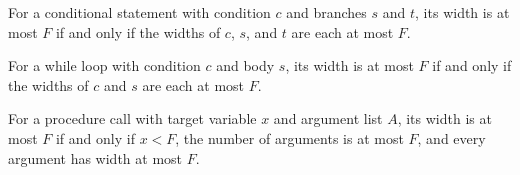 \begin{theorem}
\label{Light.Stmt.width_ite_le_iff}
\leanok
{}
For a conditional statement with condition $c$ and branches $s$ and $t$, its width is at
most $F$ if and only if the widths of $c$, $s$, and $t$ are each at most $F$.
\end{theorem}

\begin{theorem}
\label{Light.Stmt.width_while_le_iff}
\leanok
{}
For a while loop with condition $c$ and body $s$, its width is at most $F$ if and only
if the widths of $c$ and $s$ are each at most $F$.
\end{theorem}

\begin{theorem}
\label{Light.Stmt.width_call_le_iff}
\leanok
{}
For a procedure call with target variable $x$ and argument list $A$, its width is at
most $F$ if and only if $x<F$, the number of arguments is at most $F$, and every
argument has width at most $F$.
\end{theorem}
